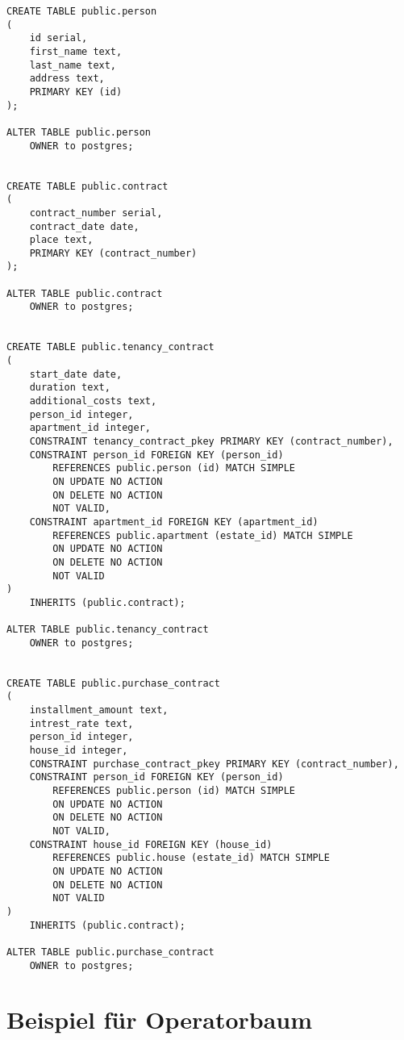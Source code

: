 \documentclass[ngerman]{dis-template-add}
\begin{document}
\begin{verbatim}
CREATE TABLE public.person
(
    id serial,
    first_name text,
    last_name text,
    address text,
    PRIMARY KEY (id)
);

ALTER TABLE public.person
    OWNER to postgres;


CREATE TABLE public.contract
(
    contract_number serial,
    contract_date date,
    place text,
    PRIMARY KEY (contract_number)
);

ALTER TABLE public.contract
    OWNER to postgres;


CREATE TABLE public.tenancy_contract
(
    start_date date,
    duration text,
    additional_costs text,
    person_id integer,
    apartment_id integer,
    CONSTRAINT tenancy_contract_pkey PRIMARY KEY (contract_number),
    CONSTRAINT person_id FOREIGN KEY (person_id)
        REFERENCES public.person (id) MATCH SIMPLE
        ON UPDATE NO ACTION
        ON DELETE NO ACTION
        NOT VALID,
    CONSTRAINT apartment_id FOREIGN KEY (apartment_id)
        REFERENCES public.apartment (estate_id) MATCH SIMPLE
        ON UPDATE NO ACTION
        ON DELETE NO ACTION
        NOT VALID
)
    INHERITS (public.contract);

ALTER TABLE public.tenancy_contract
    OWNER to postgres;


CREATE TABLE public.purchase_contract
(
    installment_amount text,
    intrest_rate text,
    person_id integer,
    house_id integer,
    CONSTRAINT purchase_contract_pkey PRIMARY KEY (contract_number),
    CONSTRAINT person_id FOREIGN KEY (person_id)
        REFERENCES public.person (id) MATCH SIMPLE
        ON UPDATE NO ACTION
        ON DELETE NO ACTION
        NOT VALID,
    CONSTRAINT house_id FOREIGN KEY (house_id)
        REFERENCES public.house (estate_id) MATCH SIMPLE
        ON UPDATE NO ACTION
        ON DELETE NO ACTION
        NOT VALID
)
    INHERITS (public.contract);

ALTER TABLE public.purchase_contract
    OWNER to postgres;
\end{verbatim}






\section{Beispiel für Operatorbaum}
\end{document}
